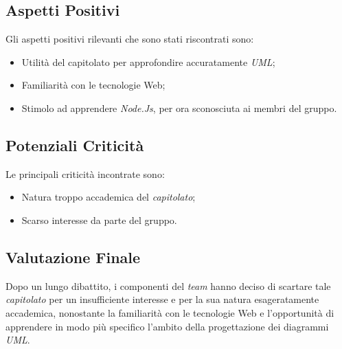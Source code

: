 \subsection{Aspetti Positivi}
	Gli aspetti positivi rilevanti che sono stati riscontrati sono:
	\begin{itemize}
		\item Utilità del capitolato per approfondire accuratamente \textit{UML};
		\item Familiarità con le tecnologie Web;
		\item Stimolo ad apprendere \textit{Node.Js}, per ora sconosciuta ai membri del gruppo.
	\end{itemize}

\subsection{Potenziali Criticità}
	Le principali criticità incontrate sono:
	\begin{itemize}
		\item Natura troppo accademica del \textit{capitolato};
		\item Scarso interesse da parte del gruppo.
	\end{itemize}

\subsection{Valutazione Finale}
	Dopo un lungo dibattito, i componenti del \textit{team} hanno deciso di scartare tale \textit{capitolato} per un insufficiente interesse e per la sua natura esageratamente accademica, nonostante la familiarità con le tecnologie Web e l'opportunità di apprendere in modo più specifico l'ambito della progettazione dei diagrammi \textit{UML}. 
	
